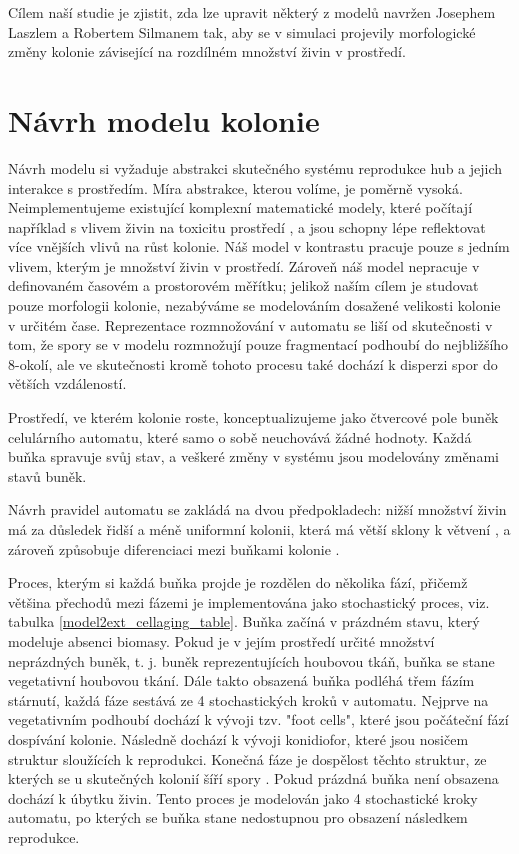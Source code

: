 \documentclass{article}
\begin{document}
Cílem naší studie je zjistit, zda lze upravit některý z modelů navržen Josephem Laszlem a Robertem Silmanem \cite{solidSubstrates} tak, aby se v simulaci projevily morfologické změny kolonie závisející na rozdílném množství živin v prostředí.

\section{Návrh modelu kolonie}

Návrh modelu si vyžaduje abstrakci skutečného systému reprodukce hub a jejich interakce s prostředím. Míra abstrakce, kterou volíme, je poměrně vysoká.  Neimplementujeme existující komplexní matematické modely, které počítají například s vlivem živin na toxicitu prostředí \cite{toxicMetals}, a jsou schopny lépe reflektovat více vnějších vlivů na růst kolonie. Náš model v kontrastu pracuje pouze s jedním vlivem, kterým je množství živin v prostředí. Zároveň náš model nepracuje v definovaném časovém a prostorovém měřítku; jelikož naším cílem je studovat pouze morfologii kolonie, nezabýváme se modelováním dosažené velikosti kolonie v určitém čase. Reprezentace rozmnožování v automatu se liší od skutečnosti v tom, že spory se v modelu rozmnožují pouze fragmentací podhoubí do nejbližšího 8-okolí, ale ve skutečnosti kromě tohoto procesu také dochází k disperzi spor do větších vzdáleností. 

Prostředí, ve kterém kolonie roste, konceptualizujeme jako čtvercové pole buněk celulárního automatu, které samo o sobě neuchovává žádné hodnoty. Každá buňka spravuje svůj stav, a veškeré změny v systému jsou modelovány změnami stavů buněk.

Návrh pravidel automatu se zakládá na dvou předpokladech: nižší množství živin má za důsledek řidší a méně uniformní kolonii, která má větší sklony k větvení \cite{solidSubstrates} \cite{morphological}, a zároveň způsobuje diferenciaci mezi buňkami kolonie \cite{differentiation}. 

Proces, kterým si každá buňka projde je rozdělen do několika fází, přičemž většina přechodů mezi fázemi je implementována jako stochastický proces, viz. tabulka \ref{model2ext_cellaging_table}. Buňka začíná v prázdném stavu, který modeluje absenci biomasy. Pokud je v jejím prostředí určité množství neprázdných buněk, t. j. buněk reprezentujících houbovou tkáň, buňka se stane vegetativní houbovou tkání. Dále takto obsazená buňka podléhá třem fázím stárnutí, každá fáze sestává ze 4 stochastických kroků v automatu. Nejprve na vegetativním podhoubí dochází k vývoji tzv. "foot cells", které jsou počáteční fází dospívání kolonie. Následně dochází k vývoji konidiofor, které jsou nosičem struktur sloužících k reprodukci. Konečná fáze je dospělost těchto struktur, ze kterých se u skutečných kolonií šíří spory \cite{differentiation}. Pokud prázdná buňka není obsazena dochází k úbytku živin. Tento proces je modelován jako 4 stochastické kroky automatu, po kterých se buňka stane nedostupnou pro obsazení následkem reprodukce. 
\end{document}
